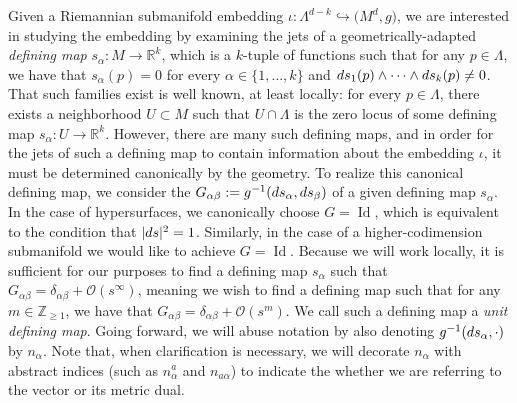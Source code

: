 \documentclass[10pt,a4paper]{article}
\numberwithin{equation}{section}
\renewcommand{\=}{\stackrel \Lambda =}
\DeclareMathOperator{\Id}{Id}
\begin{document}
Given a Riemannian submanifold embedding $\iota \colon \Lambda^{d-k} \hookrightarrow \bigl(M^d,g\bigr)$, we are interested in studying the embedding by examining the jets of a geometrically-adapted \textit{defining map} $s_{\alpha} \colon M \rightarrow \mathbb{R}^k$, which is a $k$-tuple of functions such that for any $p \in \Lambda$, we have that $s_{\alpha}(p) = 0$ for every $\alpha \in \{1, \ldots, k\}$ and ${\rm d}s_{1}(p) \wedge \cdots \wedge {\rm d}s_{k}(p) \neq 0$. That such families exist is well known, at least locally: for every $p \in \Lambda$, there exists a neighborhood $U \subset M$ such that $U \cap \Lambda$ is the zero locus of some defining map $s_{\alpha} \colon U \rightarrow \mathbb{R}^k$. However, there are many such defining maps, and in order for the jets of such a defining map to contain information about the embedding $\iota$, it must be determined canonically by the geometry. To realize this canonical defining map, we consider the  $G_{\alpha \beta} := g^{-1}({\rm d}s_{\alpha},{\rm d}s_{\beta})$ of a given defining map $s_{\alpha}$. In the case of hypersurfaces, we canonically choose $G = \Id$, which is equivalent to the condition that $|{\rm d}s|^2 = 1$. Similarly, in the case of a higher-codimension submanifold we would like to achieve $G= \Id$. Because we will work locally, it is sufficient for our purposes to find a defining map $s_{\alpha}$ such that $G_{\alpha \beta} = \delta_{\alpha \beta} + \mathcal{O}(s^\infty)$, meaning we wish to find a defining map such that for any $m \in \mathbb{Z}_{\geq 1}$, we have that $G_{\alpha \beta} = \delta_{\alpha \beta} + \mathcal{O}(s^m)$. We call such a defining map a \textit{unit defining map}. Going forward, we will abuse notation by also denoting $g^{-1}({\rm d}s_{\alpha},\cdot)$ by $n_{\alpha}$. Note that, when clarification is necessary, we will decorate $n_{\alpha}$ with abstract indices (such as $n^a_{\alpha}$ and $n_{a \alpha}$) to indicate the whether we are referring to the vector or its metric dual.
\end{document}
